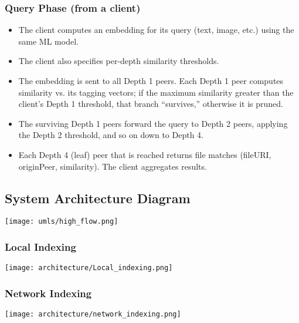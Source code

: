 \documentclass[11pt,a4paper]{article}
\begin{document}
\subsubsection{Query Phase (from a client)}
\begin{itemize}
    \item The client computes an embedding for its query (text, image, etc.) using the same ML model.

    \item The client also specifies per-depth similarity thresholds.
    \item The embedding is sent to all Depth 1 peers. Each Depth 1 peer computes similarity vs. its tagging vectors; if the maximum similarity greater than the client’s Depth 1 threshold, that branch “survives,” otherwise it is pruned.

    \item The surviving Depth 1 peers forward the query to Depth 2 peers, applying the Depth 2 threshold, and so on down to Depth 4.
    
    \item Each Depth 4 (leaf) peer that is reached returns file matches (fileURI, originPeer, similarity). The client aggregates results.
\end{itemize}

\subsection{System Architecture Diagram}
\begin{center}
    \texttt{[image: umls/high\_flow.png]}
\end{center}

\subsubsection{Local Indexing}
\begin{center}
    \texttt{[image: architecture/Local\_indexing.png]}
\end{center}

\subsubsection{Network Indexing}
\begin{center}
    \texttt{[image: architecture/network\_indexing.png]}
\end{center}
\end{document}
